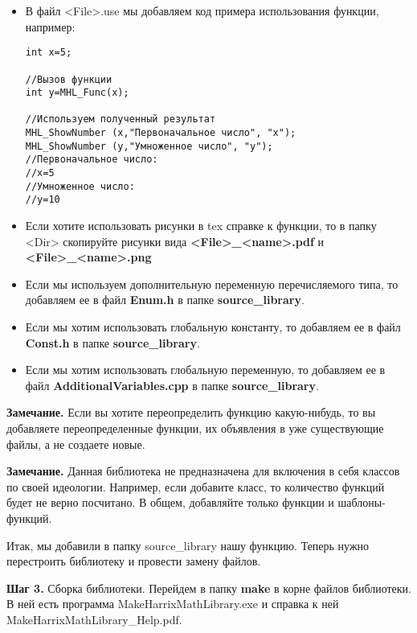 \documentclass[a4paper,12pt]{article}
\begin{document}
\begin{itemize}
\begin{lstlisting}[label=examplefiletex, caption=Содержимое MHL\_Func.tex]
 x --- входной параметр.

\textbf{Возвращаемое значение:}
Число умноженное на 2.
\end{lstlisting}

\item В файл <File>.use мы добавляем код примера использования функции, например:
\begin{lstlisting}[label=examplefileuse, caption=Содержимое MHL\_Func.use]
int x=5;

//Вызов функции
int y=MHL_Func(x);

//Используем полученный результат
MHL_ShowNumber (x,"Первоначальное число", "x");
MHL_ShowNumber (y,"Умноженное число", "y");
//Первоначальное число:
//x=5
//Умноженное число:
//y=10
\end{lstlisting}

\item Если хотите использовать рисунки в tex справке к функции, то в папку <Dir> скопируйте рисунки вида  \textbf{<File>\_<name>.pdf} и \textbf{<File>\_<name>.png}

\item Если мы используем дополнительную переменную перечисляемого типа, то добавляем ее в файл \textbf{Enum.h} в папке \textbf{source\_library}.

\item Если мы хотим использовать глобальную константу, то добавляем ее в файл \textbf{Const.h} в папке \textbf{source\_library}.

\item Если мы хотим использовать глобальную переменную, то добавляем ее в файл \textbf{AdditionalVariables.cpp} в папке \textbf{source\_library}.

\end{itemize}

\textbf{Замечание.} Если вы хотите переопределить функцию какую-нибудь, то вы добавляете переопределенные функции, их объявления в уже существующие файлы, а не создаете новые.

\textbf{Замечание.} Данная библиотека не предназначена для включения в себя классов по своей идеологии. Например, если добавите класс, то количество функций будет не верно посчитано. В общем, добавляйте только функции и шаблоны-функций.

Итак, мы добавили в папку source\_library нашу функцию. Теперь нужно перестроить библиотеку и провести замену файлов.

\textbf{Шаг 3.}\label{step3} Сборка библиотеки. Перейдем в папку \textbf{make} в корне файлов библиотеки. В ней есть программа MakeHarrixMathLibrary.exe и справка к ней MakeHarrixMathLibrary\_Help.pdf. 
\end{document}
